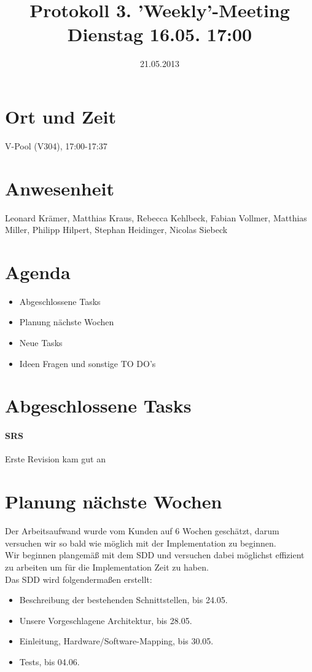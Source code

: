 \documentclass{scrartcl}
\date{21.05.2013}
\title{Protokoll 3. 'Weekly'-Meeting Dienstag 16.05. 17:00}
\begin{document}
\maketitle
\section{Ort und Zeit}
V-Pool (V304), 17:00-17:37 \\
\section{Anwesenheit}
Leonard Krämer, Matthias Kraus, Rebecca Kehlbeck, Fabian Vollmer, Matthias Miller, Philipp Hilpert, Stephan Heidinger, Nicolas Siebeck
\section{Agenda}
\begin{itemize}
\item Abgeschlossene Tasks
\item Planung nächste Wochen
\item Neue Tasks
\item Ideen Fragen und sonstige TO DO's
\end{itemize}

\section{Abgeschlossene Tasks}
\paragraph{SRS} Erste Revision kam gut an
\section{Planung nächste Wochen}
Der Arbeitsaufwand wurde vom Kunden auf 6 Wochen geschätzt, darum versuchen wir so bald wie möglich mit der Implementation zu beginnen.\\
Wir beginnen plangemäß mit dem SDD und versuchen dabei möglichst effizient zu arbeiten um für die Implementation Zeit zu haben. \\
Das SDD wird folgendermaßen erstellt:
\begin{itemize}
\item Beschreibung der bestehenden Schnittstellen, bis 24.05.
\item Unsere Vorgeschlagene Architektur, bis 28.05.
\item Einleitung, Hardware/Software-Mapping, bis 30.05.
\item Tests, bis 04.06.
\end{itemize}
\end{document}
